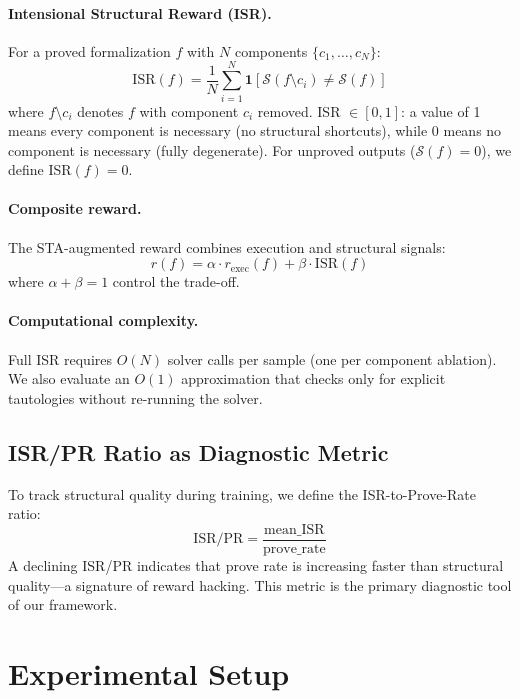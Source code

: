 \documentclass[11pt,a4paper]{article}
\begin{document}
\paragraph{Intensional Structural Reward (ISR).}
For a proved formalization $f$ with $N$ components $\{c_1, \ldots, c_N\}$:
\begin{equation}
    \text{ISR}(f) = \frac{1}{N} \sum_{i=1}^{N} \mathbf{1}\left[\mathcal{S}(f \setminus c_i) \neq \mathcal{S}(f)\right]
\end{equation}
where $f \setminus c_i$ denotes $f$ with component $c_i$ removed.
ISR $\in [0, 1]$: a value of 1 means every component is necessary (no structural shortcuts), while 0 means no component is necessary (fully degenerate).
For unproved outputs ($\mathcal{S}(f) = 0$), we define ISR$(f) = 0$.

\paragraph{Composite reward.}
The STA-augmented reward combines execution and structural signals:
\begin{equation}
    r(f) = \alpha \cdot r_{\text{exec}}(f) + \beta \cdot \text{ISR}(f)
\end{equation}
where $\alpha + \beta = 1$ control the trade-off.

\paragraph{Computational complexity.}
Full ISR requires $O(N)$ solver calls per sample (one per component ablation).
We also evaluate an $O(1)$ approximation that checks only for explicit tautologies without re-running the solver.

\subsection{ISR/PR Ratio as Diagnostic Metric}

To track structural quality during training, we define the ISR-to-Prove-Rate ratio:
\begin{equation}
    \text{ISR/PR} = \frac{\text{mean\_ISR}}{\text{prove\_rate}}
\end{equation}
A declining ISR/PR indicates that prove rate is increasing faster than structural quality---a signature of reward hacking.
This metric is the primary diagnostic tool of our framework.

\section{Experimental Setup}
\end{document}
